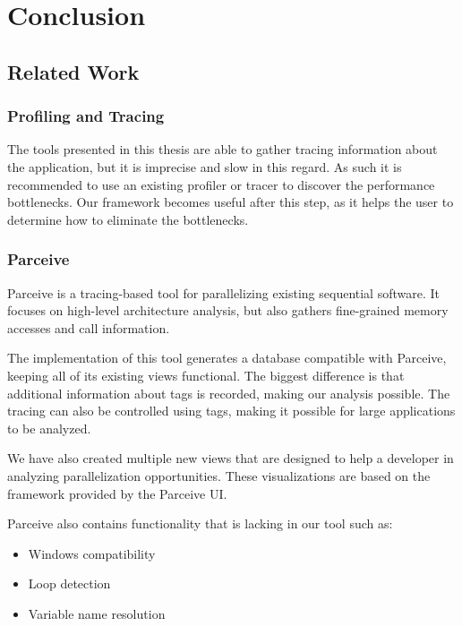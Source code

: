 \chapter{Conclusion}

\section {Related Work}

\subsection{Profiling and Tracing}

The tools presented in this thesis are able to gather tracing information about the application, but it is imprecise and slow in this regard. As such it is recommended to use an existing profiler or tracer to discover the performance bottlenecks. Our framework becomes useful after this step, as it helps the user to determine how to eliminate the bottlenecks.

\subsection{Parceive}

Parceive \cite{parceive} is a tracing-based tool for parallelizing existing sequential software. It focuses on high-level architecture analysis, but also gathers fine-grained memory accesses and call information.

The implementation of this tool generates a database compatible with Parceive, keeping all of its existing views functional. The biggest difference is that additional information about tags is recorded, making our analysis possible. The tracing can also be controlled using tags, making it possible for large applications to be analyzed.

We have also created multiple new views that are designed to help a developer in analyzing parallelization opportunities. These visualizations are based on the framework provided by the Parceive UI.

Parceive also contains functionality that is lacking in our tool such as:

\begin{itemize}
	\item Windows compatibility
	\item Loop detection
	\item Variable name resolution
\end{itemize}

